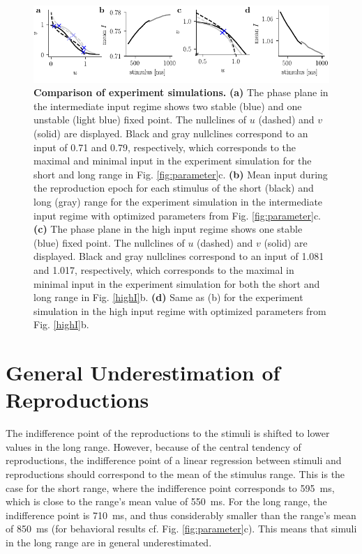 \documentclass[10pt]{article}
\begin{document}
\begin{figure}[!htb]
	\centering
	\includegraphics{figures/supp_comparison.pdf}
	\caption{\textbf{Comparison of experiment simulations.}
	\textbf{(a)} The phase plane in the intermediate input regime shows two stable (blue) and one unstable (light blue) fixed point. The nullclines of $u$ (dashed) and $v$ (solid) are displayed. Black and gray nullclines correspond to an input of 0.71 and 0.79, respectively, which corresponds to the maximal and minimal input in the experiment simulation for the short and long range in Fig. \ref{fig:parameter}c.
	\textbf{(b)} Mean input during the reproduction epoch for each stimulus of the short (black) and long (gray) range for the experiment simulation in the intermediate input regime with optimized parameters from Fig. \ref{fig:parameter}c.
	\textbf{(c)} The phase plane in the high input regime shows one stable (blue) fixed point. The nullclines of $u$ (dashed) and $v$ (solid) are displayed. Black and gray nullclines correspond to an input of 1.081 and 1.017, respectively, which corresponds to the maximal in minimal input in the experiment simulation for both the short and long range in Fig. \ref{highI}b.
	\textbf{(d)} Same as (b) for the experiment simulation in the high input regime with optimized parameters from Fig. \ref{highI}b.
	}
\label{fig:comparison}
\end{figure}

\section{General Underestimation of Reproductions}
The indifference point of the reproductions to the stimuli is shifted to lower values in the long range.
However, because of the central tendency of reproductions, the indifference point of a linear regression between stimuli and reproductions should correspond to the mean of the stimulus range.
This is the case for the short range, where the indifference point corresponds to 595~ms, which is close to the range's mean value of 550~ms. For the long range, the indifference point is 710~ms, and thus considerably smaller than the range's mean of 850~ms (for behavioral results cf. Fig. \ref{fig:parameter}c). This means that simuli in the long range are in general underestimated. 
\end{document}
